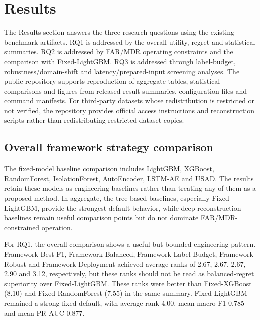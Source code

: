 \section{Results}

The Results section answers the three research questions using the existing benchmark artifacts. RQ1 is addressed by the overall utility, regret and statistical summaries. RQ2 is addressed by FAR/MDR operating constraints and the comparison with Fixed-\allowbreak LightGBM. RQ3 is addressed through label-budget, robustness/domain-shift and latency/prepared-input screening analyses. The public repository supports reproduction of aggregate tables, statistical comparisons and figures from released result summaries, configuration files and command manifests. For third-party datasets whose redistribution is restricted or not verified, the repository provides official access instructions and reconstruction scripts rather than redistributing restricted dataset copies.



\subsection{Overall framework strategy comparison}



The fixed-model baseline comparison includes LightGBM, XGBoost, RandomForest, IsolationForest, AutoEncoder, LSTM-AE and USAD. The results retain these models as engineering baselines rather than treating any of them as a proposed method. In aggregate, the tree-based baselines, especially Fixed-\allowbreak LightGBM, provide the strongest default behavior, while deep reconstruction baselines remain useful comparison points but do not dominate FAR/MDR-constrained operation.



For RQ1, the overall comparison shows a useful but bounded engineering pattern. Framework-\allowbreak Best-\allowbreak F1, Framework-\allowbreak Balanced, Framework-\allowbreak Label-\allowbreak Budget, Framework-\allowbreak Robust and Framework-\allowbreak Deployment achieved average ranks of 2.67, 2.67, 2.67, 2.90 and 3.12, respectively, but these ranks should not be read as balanced-regret superiority over Fixed-\allowbreak LightGBM. These ranks were better than Fixed-\allowbreak XGBoost (8.10) and Fixed-\allowbreak RandomForest (7.55) in the same summary. Fixed-\allowbreak LightGBM remained a strong fixed default, with average rank 4.00, mean macro-F1 0.785 and mean PR-AUC 0.877.



